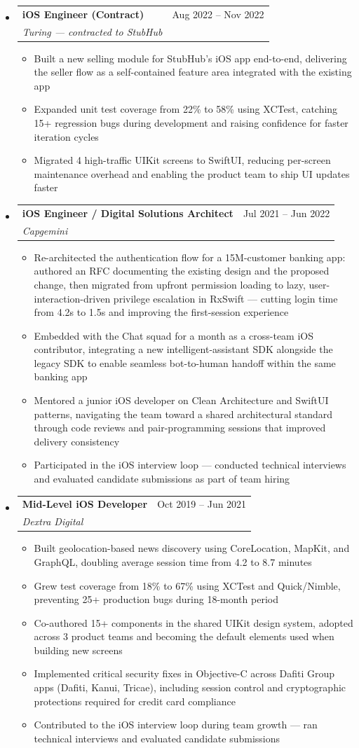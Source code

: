 \documentclass[11pt,letterpaper]{article}
\makeatletter
\newcommand{\resumeSubheading}[4]{
  \item
    \begin{tabular*}{\linewidth}{l@{\extracolsep{\fill}}r}
      \textbf{#1} & #2 \\
      \textit{#3} & \textit{#4} \\
    \end{tabular*}
}
\newcommand{\resumeItem}[1]{
  \item{#1}
}
\makeatother
\begin{document}
\begin{itemize}[leftmargin=0.15in]
    \resumeSubheading
        {iOS Engineer (Contract)}{Aug 2022 -- Nov 2022}
        {Turing — contracted to StubHub}{}
        \begin{itemize}
            \resumeItem{Built a new selling module for StubHub's iOS app end-to-end, delivering the seller flow as a self-contained feature area integrated with the existing app}
            \resumeItem{Expanded unit test coverage from 22\% to 58\% using XCTest, catching 15+ regression bugs during development and raising confidence for faster iteration cycles}
            \resumeItem{Migrated 4 high-traffic UIKit screens to SwiftUI, reducing per-screen maintenance overhead and enabling the product team to ship UI updates faster}
        \end{itemize}

    \resumeSubheading
        {iOS Engineer / Digital Solutions Architect}{Jul 2021 -- Jun 2022}
        {Capgemini}{}
        \begin{itemize}
            \resumeItem{Re-architected the authentication flow for a 15M-customer banking app: authored an RFC documenting the existing design and the proposed change, then migrated from upfront permission loading to lazy, user-interaction-driven privilege escalation in RxSwift — cutting login time from 4.2s to 1.5s and improving the first-session experience}
            \resumeItem{Embedded with the Chat squad for a month as a cross-team iOS contributor, integrating a new intelligent-assistant SDK alongside the legacy SDK to enable seamless bot-to-human handoff within the same banking app}
            \resumeItem{Mentored a junior iOS developer on Clean Architecture and SwiftUI patterns, navigating the team toward a shared architectural standard through code reviews and pair-programming sessions that improved delivery consistency}
            \resumeItem{Participated in the iOS interview loop — conducted technical interviews and evaluated candidate submissions as part of team hiring}
        \end{itemize}

    \resumeSubheading
        {Mid-Level iOS Developer}{Oct 2019 -- Jun 2021}
        {Dextra Digital}{}
        \begin{itemize}
            \resumeItem{Built geolocation-based news discovery using CoreLocation, MapKit, and GraphQL, doubling average session time from 4.2 to 8.7 minutes}
            \resumeItem{Grew test coverage from 18\% to 67\% using XCTest and Quick/Nimble, preventing 25+ production bugs during 18-month period}
            \resumeItem{Co-authored 15+ components in the shared UIKit design system, adopted across 3 product teams and becoming the default elements used when building new screens}
            \resumeItem{Implemented critical security fixes in Objective-C across Dafiti Group apps (Dafiti, Kanui, Tricae), including session control and cryptographic protections required for credit card compliance}
            \resumeItem{Contributed to the iOS interview loop during team growth — ran technical interviews and evaluated candidate submissions}
        \end{itemize}


\end{itemize}
\end{document}
